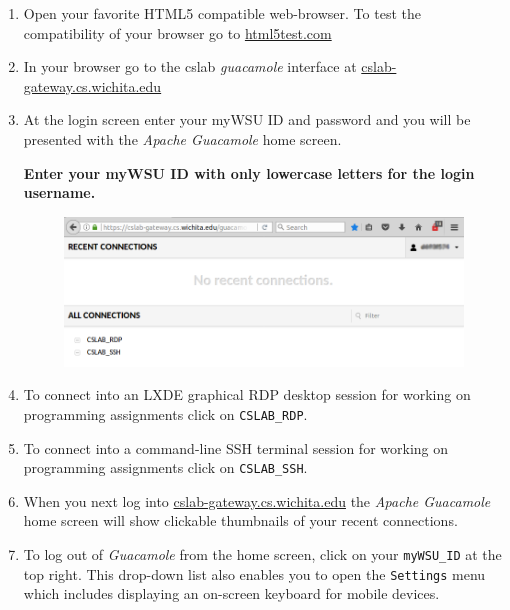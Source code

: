 \documentclass[12pt]{article}
\begin{document}
\begin{enumerate}
  \item Open your favorite HTML5 compatible web-browser. To test the compatibility of your browser go to \href{https://html5test.com/}{html5test.com}
  \item In your browser go to the cslab \textit{guacamole} interface at \href{https://cslab-gateway.cs.wichita.edu/}{cslab-gateway.cs.wichita.edu}
  \item At the login screen enter your myWSU ID and password and you will be presented with the \textit{Apache Guacamole} home screen.

  \textbf{Enter your myWSU ID with only lowercase letters for the login username.}

\begin{figure}[h]
\includegraphics[width=\linewidth]{screenshot_cslab_initial_homescreen}
\centering
\end{figure}

  \item To connect into an LXDE graphical RDP desktop session for working on programming assignments click on \texttt{CSLAB\_RDP}.
  \item To connect into a command-line SSH terminal session for working on programming assignments click on \texttt{CSLAB\_SSH}.
  \item When you next log into \href{https://cslab-gateway.cs.wichita.edu/}{cslab-gateway.cs.wichita.edu} the \textit{Apache Guacamole} home screen will show clickable thumbnails of your recent connections.
  \item To log out of \textit{Guacamole} from the home screen, click on your \texttt{myWSU\_ID} at the top right. This drop-down list also enables you to open the \texttt{Settings} menu which includes displaying an on-screen keyboard for mobile devices.


\end{enumerate}
\end{document}

